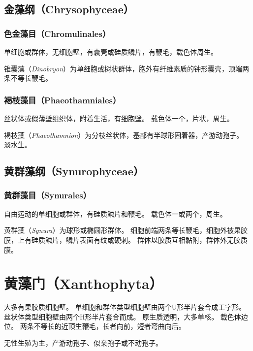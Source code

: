 \documentclass[11pt]{article}
\begin{document}
\subsection{金藻纲（Chrysophyceae）}
\subsubsection{色金藻目（Chromulinales）}
单细胞或群体，无细胞壁，有囊壳或硅质鳞片，有鞭毛，载色体周生。

\newline

锥囊藻（\textit{Dinobryon}）为单细胞或树状群体，胞外有纤维素质的钟形囊壳，顶端两条不等长鞭毛。

\subsubsection{褐枝藻目（Phaeothamniales）}
丝状体或假薄壁组织体，附着生活，有细胞壁。
载色体一个，片状，周生。

\newline

褐枝藻（\textit{Phaeothamnion}）为分枝丝状体，基部有半球形固着器，产游动孢子。
淡水生。

\subsection{黄群藻纲（Synurophyceae）}
\subsubsection{黄群藻目（Synurales）}
自由运动的单细胞或群体，有硅质鳞片和鞭毛。
载色体一或两个，周生。

\newline

黄群藻（\textit{Synura}）为球形或椭圆形群体。
细胞前端两条等长鞭毛，细胞外被果胶膜，上有硅质鳞片，鳞片表面有纹或硬刺。
群体以胶质互相黏附，群体外无胶质膜。

\section{黄藻门（Xanthophyta）}
大多有果胶质细胞壁。
单细胞和群体类型细胞壁由两个U形半片套合成工字形。
丝状体类型细胞壁由两个H形半片套合而成。
原生质透明，大多单核。
载色体边位。
两条不等长的近顶生鞭毛，长者向前，短者弯曲向后。

\newline

无性生殖为主，产游动孢子、似亲孢子或不动孢子。
\end{document}

